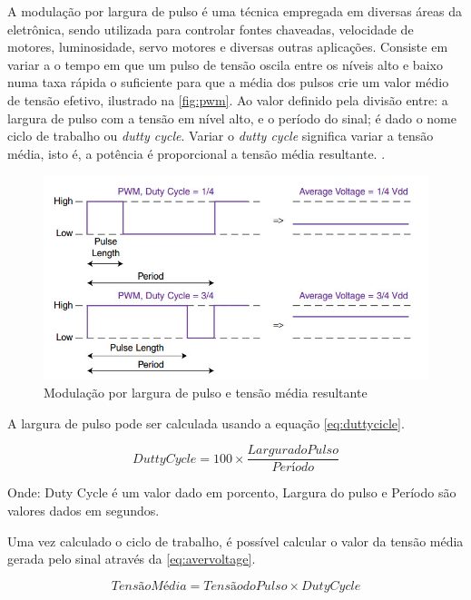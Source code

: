 A modulação por largura de pulso é uma técnica empregada em diversas áreas da eletrônica, sendo utilizada para controlar fontes chaveadas, velocidade de motores, luminosidade, servo motores e diversas outras aplicações. Consiste em variar a o tempo em que um pulso de tensão oscila entre os níveis alto e baixo numa taxa rápida o suficiente para que a média dos pulsos crie um valor médio de tensão efetivo, ilustrado na \autoref{fig:pwm}. Ao valor definido pela divisão entre: a largura de pulso com a tensão em nível alto, e o período do sinal; é dado o nome ciclo de trabalho ou \textit{dutty cycle}. Variar o \textit{dutty cycle} significa variar a tensão média, isto é, a potência é proporcional a tensão média resultante. .

\begin{figure}[h]
	\centering
	\includegraphics[width=1\textwidth]{figuras/pwm.jpg}
	\caption{Modulação por largura de pulso e tensão média resultante}
	\label{fig:pwm}
\end{figure}

A largura de pulso pode ser calculada usando a equação \autoref{eq:duttycicle}.

\begin{equation}
{Dutty Cycle} = 100 \times \frac{Largura do Pulso}{Período}  
\label{eq:duttycicle}
\end{equation}

Onde: Duty Cycle é um valor dado em porcento, Largura do pulso e Período são valores dados em segundos.\par

Uma vez calculado o ciclo de trabalho, é possível calcular o valor da tensão média gerada pelo sinal através da \autoref{eq:avervoltage}.

\begin{equation}
{Tensão Média} = {Tensão do Pulso} \times {Duty Cycle}
\label{eq:avervoltage}
\end{equation}


